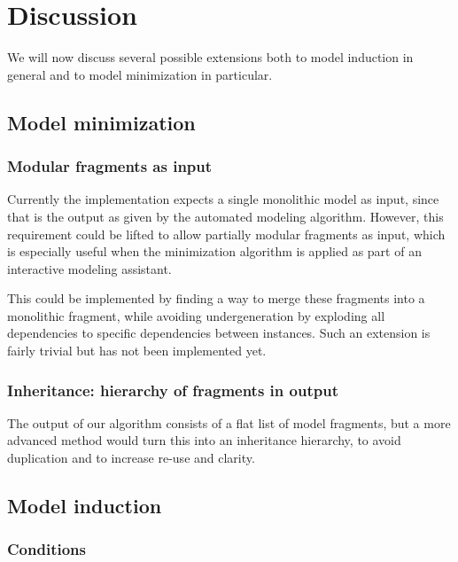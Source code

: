 \documentclass{article} %
\begin{document}

\section{Discussion}
We will now discuss several possible extensions both to model induction in
general and to model minimization in particular.

\subsection{Model minimization}


\subsubsection{Modular fragments as input}

Currently the implementation expects a single monolithic model as input, since
that is the output as given by the automated modeling algorithm. However, this
requirement could be lifted to allow partially modular fragments as input,
which is especially useful when the minimization algorithm is applied as part
of an interactive modeling assistant.

This could be implemented by finding a way to merge these fragments into a
monolithic fragment, while avoiding undergeneration by exploding all
dependencies to specific dependencies between instances. Such an extension is
fairly trivial but has not been implemented yet.

\subsubsection{Inheritance: hierarchy of fragments in output}

The output of our algorithm consists of a flat list of model fragments, but a
more advanced method would turn this into an inheritance hierarchy, to avoid
duplication and to increase re-use and clarity.

\subsection{Model induction}

\subsubsection{Conditions}
\end{document}
